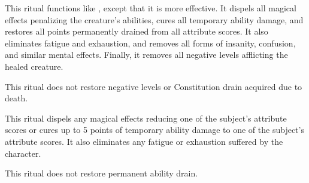 \begin{spelleffect}
This ritual functions like , except that it is more effective. It dispels all magical effects penalizing the creature's abilities, cures all temporary ability damage, and restores all points permanently drained from all attribute scores. It also eliminates fatigue and exhaustion, and removes all forms of insanity, confusion, and similar mental effects. Finally, it removes all negative levels afflicting the healed creature. 
\end{spelleffect}
\begin{spellnotes}
This ritual does not restore negative levels or Constitution drain acquired due to death.
\end{spellnotes}

\begin{spelleffect}
This ritual dispels any magical effects reducing one of the subject's attribute scores or cures up to 5 points of temporary ability damage to one of the subject's attribute scores. It also eliminates any fatigue or exhaustion suffered by the character.
\end{spelleffect}
\begin{spellnotes}
This ritual does not restore permanent ability drain.
\end{spellnotes}

